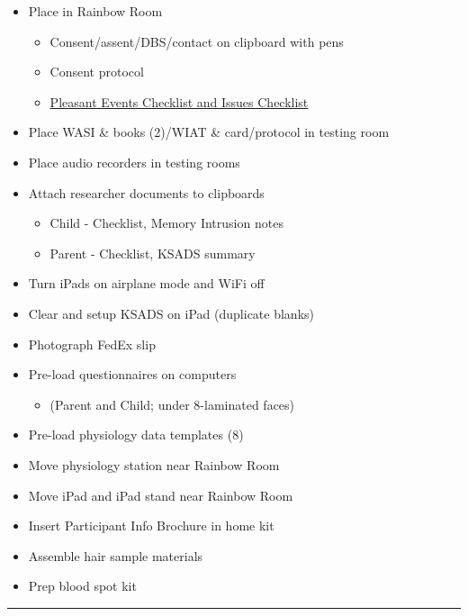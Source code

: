 \documentclass[
]{book}
\providecommand{\tightlist}{%
  \setlength{\itemsep}{0pt}\setlength{\parskip}{0pt}}
\begin{document}
\begin{itemize}
\tightlist
\item
  Place in Rainbow Room

  \begin{itemize}
  \tightlist
  \item
    Consent/assent/DBS/contact on clipboard with pens
  \item
    Consent protocol
  \item
    \href{https://app.box.com/file/630327764749}{Pleasant Events Checklist and Issues Checklist}
  \end{itemize}
\item
  Place WASI \& books (2)/WIAT \& card/protocol in testing room
\item
  Place audio recorders in testing rooms
\item
  Attach researcher documents to clipboards

  \begin{itemize}
  \tightlist
  \item
    Child - Checklist, Memory Intrusion notes
  \item
    Parent - Checklist, KSADS summary
  \end{itemize}
\item
  Turn iPads on airplane mode and WiFi off
\item
  Clear and setup KSADS on iPad (duplicate blanks)
\item
  Photograph FedEx slip
\item
  Pre-load questionnaires on computers

  \begin{itemize}
  \tightlist
  \item
    (Parent and Child; under 8-laminated faces)
  \end{itemize}
\item
  Pre-load physiology data templates (8)
\item
  Move physiology station near Rainbow Room
\item
  Move iPad and iPad stand near Rainbow Room
\item
  Insert Participant Info Brochure in home kit
\item
  Assemble hair sample materials
\item
  Prep blood spot kit
\end{itemize}

\begin{center}\rule{0.5\linewidth}{0.5pt}\end{center}
\end{document}
